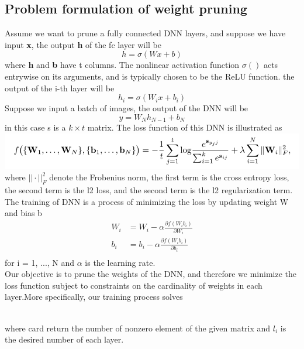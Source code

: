 \documentclass{acmtog} %
\begin{document}
\subsection{Problem formulation of weight pruning}
Assume we want to prune a fully connected DNN layers, and suppose we have input \textbf{x}, the output \textbf{h} of the fc layer will be
$$h = \sigma(Wx + b)$$
where \textbf{h} and \textbf{b} have t columns. The nonlinear activation function $\sigma()$ acts entrywise on its arguments, and is typically chosen to be the ReLU function. the output of the i-th layer will be 
$$h_i =\sigma(W_ix + b_i) $$
Suppose we input a batch of images, the output of the DNN will be
$$y = W_Nh_{N-1} + b_N$$
in this case s is a $k\times t$ matrix. The loss function of this DNN is illustrated as\\
\includegraphics[scale = 0.4]{graph/pf_5.png}
where $||\cdot||_F^2$ denote the Frobenius norm, the first term is the cross entropy loss, the second term is the l2 loss, and the second term is the l2 regularization term. The training of DNN is a process of minimizing the loss by updating weight W and bias b
\begin{align*}
  W_i &= W_i - \alpha\frac{\partial f({W_i}{b_i})}{\partial W_i}\\
  b_i &= b_i - \alpha\frac{\partial f({W_i}{b_i})}{\partial b_i}\\
\end{align*}
for i = 1, ..., N and $\alpha$ is the learning rate.\\
Our objective is to prune the weights of the DNN, and therefore we minimize the loss function subject to constraints on the cardinality of weights in each layer.More specifically, our training process solves\\
\begin{figure}[h]
\end{figure}\\
where card return the number of nonzero element of the given matrix and $l_i$ is the desired number of each layer.
\end{document}
